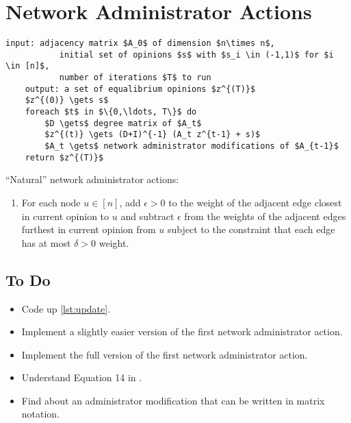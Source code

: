 \section*{Network Administrator Actions}

\begin{minipage}{\linewidth}
\begin{lstlisting}[caption={Opinion formation with network administrator.}, label={lst:update}]
    input: adjacency matrix $A_0$ of dimension $n\times n$,
           initial set of opinions $s$ with $s_i \in (-1,1)$ for $i \in [n]$,
           number of iterations $T$ to run
    output: a set of equalibrium opinions $z^{(T)}$
    $z^{(0)} \gets s$
    foreach $t$ in $\{0,\ldots, T\}$ do
        $D \gets$ degree matrix of $A_t$
        $z^{(t)} \gets (D+I)^{-1} (A_t z^{t-1} + s)$
        $A_t \gets$ network administrator modifications of $A_{t-1}$
    return $z^{(T)}$
\end{lstlisting}
\end{minipage}

``Natural'' network administrator actions:
\begin{enumerate}
    \item For each node $u \in [n]$,
    add $\epsilon > 0$ to the weight of the adjacent edge closest
    in current opinion to $u$
    and subtract $\epsilon$ from the weights of the adjacent
    edges furthest in current opinion from $u$ subject to the
    constraint that each edge has at most $\delta > 0$ weight.
\end{enumerate}

\subsection*{To Do}
\begin{itemize}
    \item[\checkmark] Code up \autoref{lst:update}.
    \item[\checkmark] Implement a slightly easier version of the first network
    administrator action.
    \item Implement the full version of the first network
    administrator action.
    \item Understand Equation 14 in \cite{chitra_analyzing_2020}.
    \item Find about an administrator modification that
    can be written in matrix notation.
\end{itemize}